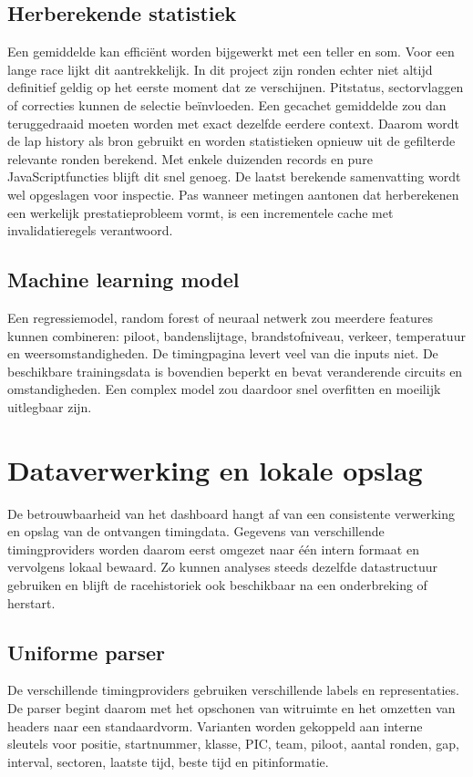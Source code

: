 \subsection{Herberekende statistiek}
Een gemiddelde kan efficiënt worden bijgewerkt met een teller en som. Voor een lange race lijkt dit
aantrekkelijk. In dit project zijn ronden echter niet altijd definitief geldig op het eerste moment
dat ze verschijnen. Pitstatus, sectorvlaggen of correcties kunnen de selectie beïnvloeden. Een
gecachet gemiddelde zou dan teruggedraaid moeten worden met exact dezelfde eerdere context.
Daarom wordt de lap history als bron gebruikt en worden statistieken opnieuw uit de gefilterde
relevante ronden berekend. Met enkele duizenden records en pure JavaScriptfuncties blijft dit snel
genoeg. De laatst berekende samenvatting wordt wel opgeslagen voor inspectie. Pas wanneer metingen
aantonen dat herberekenen een werkelijk prestatieprobleem vormt, is een incrementele cache met
invalidatieregels verantwoord.

\subsection{Machine learning model}
Een regressiemodel, random forest of neuraal netwerk zou meerdere features kunnen combineren:
piloot, bandenslijtage, brandstofniveau, verkeer, temperatuur en weersomstandigheden. De
timingpagina levert veel van die inputs niet. De beschikbare trainingsdata is bovendien beperkt en
bevat veranderende circuits en omstandigheden. Een complex model zou daardoor snel overfitten en
moeilijk uitlegbaar zijn.

\section{Dataverwerking en lokale opslag}
\label{chap:data}

De betrouwbaarheid van het dashboard hangt af van een consistente verwerking en opslag van de ontvangen timingdata. Gegevens van verschillende timingproviders worden daarom eerst omgezet naar één intern formaat en vervolgens lokaal bewaard. Zo kunnen analyses steeds dezelfde datastructuur gebruiken en blijft de racehistoriek ook beschikbaar na een onderbreking of herstart.

\subsection{Uniforme parser}
De verschillende timingproviders gebruiken verschillende labels en representaties. De parser begint daarom met het
opschonen van witruimte en het omzetten van headers naar een standaardvorm. Varianten worden gekoppeld aan interne
sleutels voor positie, startnummer, klasse, PIC, team, piloot, aantal ronden, gap, interval,
sectoren, laatste tijd, beste tijd en pitinformatie.

